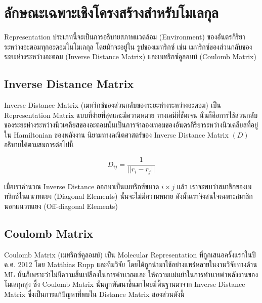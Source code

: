 \section{ลักษณะเฉพาะเชิงโครงสร้างสำหรับโมเลกุล}
\label{sec:struc_feat_mol}

Representation ประเภทนี้จะเป็นการอธิบายสภาพแวดล้อม (Environment) ของอันตรกิริยาระหว่างอะตอมทุกอะตอมในโมเลกุล โดยมักจะอยู่ใน%
รูปของเมทริกซ์ เช่น เมทริกซ์ของส่วนกลับของระยะห่างระหว่างอะตอม (Inverse Distance Matrix) และเมทริกซ์คูลอมบ์ (Coulomb Matrix)

\subsection{Inverse Distance Matrix}
\label{ssec:inv_dist_mat}

Inverse Distance Matrix (เมทริกซ์ของส่วนกลับของระยะห่างระหว่างอะตอม) เป็น Representation Matrix แบบที่ง่ายที่สุดและมีความหมาย%
ทางเคมีที่ชัดเจน นั่นก็คือการใช้ส่วนกลับของระยะห่างระหว่างนิวเคลียสของอะตอมนั้นเป็นการจำลองเทอมของอันตรกิริยาระหว่างนิวเคลียสที่อยู่ใน 
Hamiltonian ของพลังงาน นิยามทางคณิตศาสตร์ของ Inverse Distance Matrix $(D)$ อธิบายได้ตามสมการต่อไปนี้

\begin{equation}
    D_{ij} = \frac{1}{||r_{i} - r_{j}||}
\end{equation}

เมื่อเราคำนวณ Inverse Distance ออกมาเป็นเมทริกซ์ขนาด $i \times j$ แล้ว เราจะพบว่าสมาชิกของเมทริกซ์ในแนวทแยง (Diagonal 
Elements) นั้นจะไม่มีความหมาย ดังนั้นเราจึงสนใจเฉพาะสมาชิกนอกแนวทแยง (Off-diagonal Elements)

\subsection{Coulomb Matrix}
\label{ssec:coulomb_mat}

Coulomb Matrix (เมทริกซ์คูลอมบ์) เป็น Molecular Representation ที่ถูกเสนอครั้งแรกในปี ค.ศ. 2012 โดย Matthias Rupp 
และทีมวิจัย\autocite{rupp2012} โดยได้ถูกนำมาใช้อย่างแพร่หลายในงานวิจัยทางด้าน ML นั่นก็เพราะว่าไม่มีความสิ้นเปลืองในการคำนวณและ%
ให้ความแม่นยำในการทำนายค่าพลังงานของโมเลกุลสูง ซึ่ง Coulomb Matrix นั้นถูกพัฒนาขึ้นมาโดยมีพื้นฐานมาจาก Inverse Distance Matrix 
ซึ่งเป็นการแก้ปัญหาที่พบใน Distance Matrix สองส่วนดังนี้

